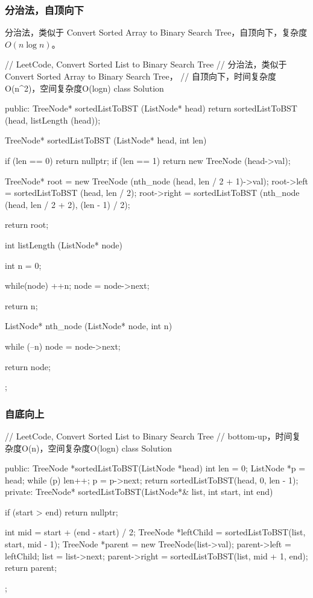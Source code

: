 \subsubsection{分治法，自顶向下}
分治法，类似于 Convert Sorted Array to Binary Search Tree，自顶向下，复杂度$O(n\log n)$。
\begin{Code}
	// LeetCode, Convert Sorted List to Binary Search Tree
	// 分治法，类似于 Convert Sorted Array to Binary Search Tree，
	// 自顶向下，时间复杂度O(n^2)，空间复杂度O(logn)
	class Solution {
		public:
		TreeNode* sortedListToBST (ListNode* head) {
			return sortedListToBST (head, listLength (head));
		}
		
		TreeNode* sortedListToBST (ListNode* head, int len) {
			if (len == 0) return nullptr;
			if (len == 1) return new TreeNode (head->val);
			
			TreeNode* root = new TreeNode (nth_node (head, len / 2 + 1)->val);
			root->left = sortedListToBST (head, len / 2);
			root->right = sortedListToBST (nth_node (head, len / 2 + 2), 
			(len - 1) / 2);
			
			return root;
		}
		
		int listLength (ListNode* node) {
			int n = 0;
			
			while(node) {
				++n;
				node = node->next;
			}
			
			return n;
		}
		
		ListNode* nth_node (ListNode* node, int n) {
			while (--n)
			node = node->next;
			
			return node;
		}
	};
\end{Code}


\subsubsection{自底向上}
\begin{Code}
	// LeetCode, Convert Sorted List to Binary Search Tree
	// bottom-up，时间复杂度O(n)，空间复杂度O(logn)
	class Solution {
		public:
		TreeNode *sortedListToBST(ListNode *head) {
			int len = 0;
			ListNode *p = head;
			while (p) {
				len++;
				p = p->next;
			}
			return sortedListToBST(head, 0, len - 1);
		}
		private:
		TreeNode* sortedListToBST(ListNode*& list, int start, int end) {
			if (start > end) return nullptr;
			
			int mid = start + (end - start) / 2;
			TreeNode *leftChild = sortedListToBST(list, start, mid - 1);
			TreeNode *parent = new TreeNode(list->val);
			parent->left = leftChild;
			list = list->next;
			parent->right = sortedListToBST(list, mid + 1, end);
			return parent;
		}
	};
\end{Code}



